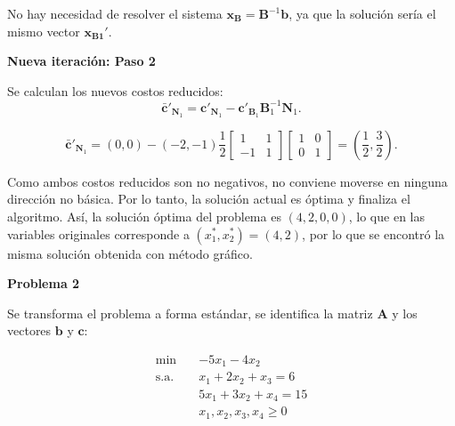 \begin{enumerate}
    No hay necesidad de resolver el sistema $ \mathbf{x}_{\mathbf{B}} = \mathbf{B}^{-1}\mathbf{b}$, ya que la solución sería el mismo vector $\mathbf{x}_{\mathbf{B1}}'$.

    \noindent\textbf{Nueva iteración: Paso 2}

    Se calculan los nuevos costos reducidos:
    \begin{equation}
        \bar{\mathbf{c}}'_{\mathbf{N}_1}
        =
        \mathbf{c}'_{\mathbf{N}_1}
        -
        \mathbf{c}'_{\mathbf{B}_1}\mathbf{B}_1^{-1}\mathbf{N}_1.
    \end{equation}

    \begin{equation}
        \bar{\mathbf{c}}'_{\mathbf{N}_1}
        =
        (0,0)
        -
        (-2,-1)
        \frac{1}{2}
        \begin{bmatrix}
            1 & 1 \\
            -1 & 1
        \end{bmatrix}
        \begin{bmatrix}
            1 & 0 \\
            0 & 1
        \end{bmatrix}
        =
        \left(
        \frac{1}{2},
        \frac{3}{2}
        \right).
    \end{equation}

    Como ambos costos reducidos son no negativos, no conviene moverse en ninguna dirección no básica. Por lo tanto, la solución actual es óptima y finaliza el algoritmo. Así, la solución óptima del problema es $ (4,2,0,0)$,
    lo que en las variables originales corresponde a $ (x_1^*,x_2^*) = (4,2)$, por lo que se encontró la misma solución obtenida con método gráfico.
    
\noindent\textbf{Problema 2}\par

Se transforma el problema a forma estándar, se identifica la matriz $\mathbf{A}$ y los vectores $\mathbf{b}$ y $\mathbf{c}$:

\begin{equation}
\begin{aligned}
    \min \quad & -5x_1 - 4x_2 \\
    \text{s.a.} \quad & x_1 + 2x_2 + x_3 = 6 \\
    & 5x_1 + 3x_2 + x_4 = 15 \\
    & x_1,x_2,x_3,x_4 \geq 0
\end{aligned}
\end{equation}


\end{enumerate}
